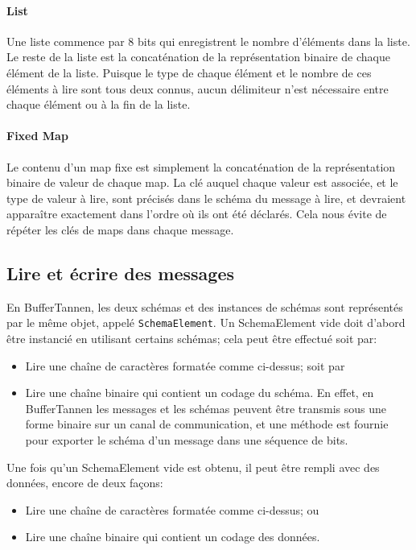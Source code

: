 \paragraph{List} Une liste commence par 8 bits qui enregistrent le nombre d'éléments dans la liste. Le reste de la liste est la concaténation de la représentation binaire de chaque élément de la liste. Puisque le type de chaque élément et le nombre de ces éléments à lire sont tous deux connus, aucun délimiteur n'est nécessaire entre chaque élément ou à la fin de la liste.

\paragraph{Fixed Map} Le contenu d'un map fixe est simplement la concaténation de la représentation binaire de valeur de chaque map. La clé auquel chaque valeur est associée, et le type de valeur à lire, sont précisés dans le schéma du message à lire, et devraient apparaître exactement dans l'ordre où ils ont été déclarés. Cela nous évite de répéter les clés de maps dans chaque message.

\subsection{Lire et écrire des messages}

En BufferTannen, les deux schémas et des instances de schémas sont représentés par le même objet, appelé \verb+SchemaElement+. Un SchemaElement vide doit d'abord être instancié en utilisant certains schémas; cela peut être effectué soit par:

\begin{itemize}
\item Lire une chaîne de caractères formatée comme ci-dessus; soit par

\item Lire une chaîne binaire qui contient un codage du schéma. En effet, en BufferTannen les messages et les schémas peuvent être transmis sous une forme binaire sur un canal de communication, et une méthode est fournie pour exporter le schéma d'un message dans une séquence de bits.
\end{itemize}

Une fois qu'un SchemaElement vide est obtenu, il peut être rempli avec des données, encore de deux façons:

\begin{itemize}
\item Lire une chaîne de caractères formatée comme ci-dessus; ou

\item Lire une chaîne binaire qui contient un codage des données.
\end{itemize}


